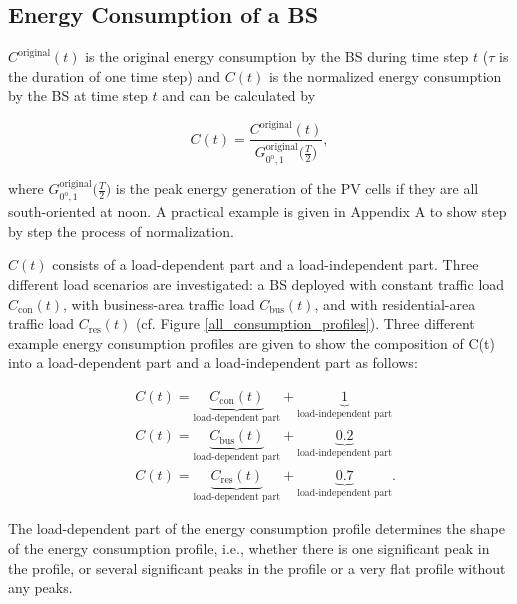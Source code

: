 \subsection{Energy Consumption of a BS\label{consumption}}


$C^{\text{original}}(t)$ is the original energy consumption by the BS during time step $t$ ($\tau$ is the duration of one time step) and $C(t)$ is the normalized energy consumption by the BS at time step $t$ and can be calculated by

\begin{equation}
C(t)=\frac{C^{\text{original}}(t)}{G^{\text{original}}_{0^{\mathrm{o}},1}\big(\frac{T}{2}\big)},
\end{equation}

where $G^{\text{original}}_{0^{\mathrm{o}},1}\big(\frac{T}{2}\big)$ is the peak energy generation of the PV cells if they are all south-oriented at noon.
A practical example is given in Appendix A to show step by step the process of normalization. 

$C(t)$ consists of a load-dependent part and a load-independent part. Three different load scenarios are investigated: a BS deployed with constant traffic load $C_{\mathrm{con}}(t)$, with business-area traffic load $C_{\mathrm{bus}}(t)$, and with residential-area traffic load $C_{\mathrm{res}}(t)$ (cf. Figure \ref{all_consumption_profiles}). Three different example energy consumption profiles are given to show the composition of C(t) into a load-dependent part and a load-independent part as follows:

\begin{align}
&C(t)=\underbrace{C_{\mathrm{con}}(t)}_{\text{load-dependent part}} + \underbrace{1}_{\text{load-independent part}}\\
&C(t)=\underbrace{C_{\mathrm{bus}}(t)}_{\text{load-dependent part}} + \underbrace{0.2}_{\text{load-independent part}}\\
&C(t)=\underbrace{C_{\mathrm{res}}(t)}_{\text{load-dependent part}} + \underbrace{0.7}_{\text{load-independent part}}.
\end{align}

The load-dependent part of the energy consumption profile determines the shape of the energy consumption profile, i.e., whether there is one significant peak in the profile, or several significant peaks in the profile or a very flat profile without any peaks.

